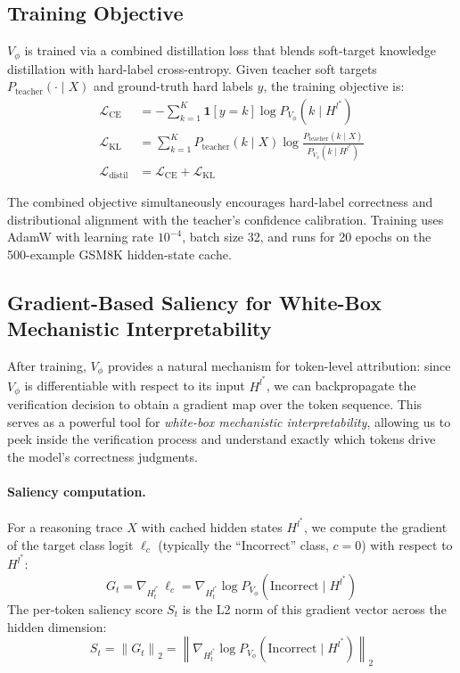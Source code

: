 \documentclass{article}
\begin{document}
\subsection{Training Objective}
\label{sec:training}

$V_\phi$ is trained via a combined distillation loss that blends soft-target knowledge distillation with hard-label cross-entropy. Given teacher soft targets $P_{\text{teacher}}(\cdot \mid X)$ and ground-truth hard labels $y$, the training objective is:
\begin{align}
  \mathcal{L}_{\text{CE}} &= -\sum_{k=1}^{K} \mathbf{1}[y=k] \log P_{V_\phi}(k \mid H^{l^*}) \label{eq:ce} \\
  \mathcal{L}_{\text{KL}} &= \sum_{k=1}^{K} P_{\text{teacher}}(k \mid X) \log \frac{P_{\text{teacher}}(k \mid X)}{P_{V_\phi}(k \mid H^{l^*})} \label{eq:kl} \\
  \mathcal{L}_{\text{distil}} &= \mathcal{L}_{\text{CE}} + \mathcal{L}_{\text{KL}} \label{eq:total}
\end{align}

The combined objective simultaneously encourages hard-label correctness and distributional alignment with the teacher's confidence calibration. Training uses AdamW \citep{loshchilov2018decoupled} with learning rate $10^{-4}$, batch size 32, and runs for 20 epochs on the 500-example GSM8K hidden-state cache.

\subsection{Gradient-Based Saliency for White-Box Mechanistic Interpretability}
\label{sec:saliency}

After training, $V_\phi$ provides a natural mechanism for token-level attribution: since $V_\phi$ is differentiable with respect to its input $H^{l^*}$, we can backpropagate the verification decision to obtain a gradient map over the token sequence. This serves as a powerful tool for \emph{white-box mechanistic interpretability}, allowing us to peek inside the verification process and understand exactly which tokens drive the model's correctness judgments.

\paragraph{Saliency computation.} For a reasoning trace $X$ with cached hidden states $H^{l^*}$, we compute the gradient of the target class logit $\ell_c$ (typically the ``Incorrect'' class, $c=0$) with respect to $H^{l^*}$:
\begin{equation}
  G_{t} = \nabla_{H^{l^*}_t} \,\ell_c = \nabla_{H^{l^*}_t} \log P_{V_\phi}(\text{Incorrect} \mid H^{l^*})
  \label{eq:grad}
\end{equation}
The per-token saliency score $S_t$ is the L2 norm of this gradient vector across the hidden dimension:
\begin{equation}
  S_t = \left\| G_t \right\|_2 = \left\| \nabla_{H^{l^*}_t} \log P_{V_\phi}(\text{Incorrect} \mid H^{l^*}) \right\|_2
  \label{eq:saliency}
\end{equation}
\end{document}
